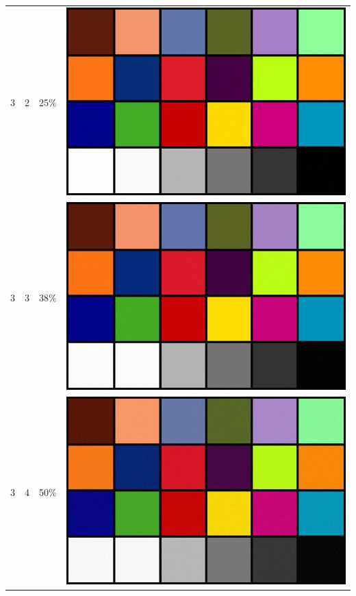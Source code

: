 \documentclass[times, utf8, seminar, numeric]{fer}
\begin{document}
\begin{center}
\begin{longtable}{|c|c|c|c|}
3 & 2 &25\% & \includegraphics[scale=0.3]{../benchmark_results/color_chart/3_components-2_bits.png} \\
3 & 3 &38\% & \includegraphics[scale=0.3]{../benchmark_results/color_chart/3_components-3_bits.png} \\
3 & 4 &50\% & \includegraphics[scale=0.3]{../benchmark_results/color_chart/3_components-4_bits.png} \\

\end{longtable}
\end{center}
\end{document}
